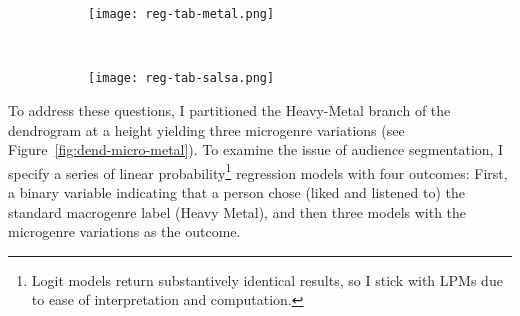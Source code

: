 \documentclass[a4paper,12pt]{article}
\begin{document}
\begin{figure}[t!]
    \captionsetup[subfigure]{font=footnotesize}
    \caption{Coefficient estimates from Linear Probability Models predicting macrogenre and microgenre choices for Metal and Salsa using socio-demographic predictors.}
    \label{tab:reg}
    \centering    
     \begin{subfigure}[b]{0.9\textwidth}
        \texttt{[image: reg-tab-metal.png]}
    \end{subfigure} \\
     \begin{subfigure}[b]{0.9\textwidth}
        \texttt{[image: reg-tab-salsa.png]}
    \end{subfigure}
\end{figure}
    
To address these questions, I partitioned the Heavy-Metal branch of the dendrogram at a height yielding three microgenre variations (see Figure~\ref{fig:dend-micro-metal}). To examine the issue of audience segmentation, I specify a series of linear probability\footnote{Logit models return substantively identical results, so I stick with LPMs due to ease of interpretation and computation.} regression models with four outcomes: First, a binary variable indicating that a person chose (liked and listened to) the standard macrogenre label (Heavy Metal), and then three models with the microgenre variations as the outcome. 
\end{document}
